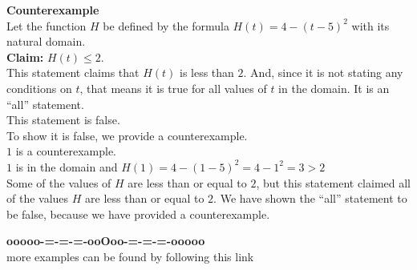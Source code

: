 \documentclass{ximera}
\begin{document}
\begin{example}    \textbf{\textcolor{blue!55!black}{Counterexample}} \\



Let the function $H$ be defined by the formula $H(t) = 4 - (t-5)^2$ with its natural domain. \\

\textbf{\textcolor{blue!55!black}{Claim:}} $H(t) \leq 2$.  \\



This statement claims that $H(t)$ is less than $2$.  And, since it is not stating any conditions on $t$, that means it is true for all values of $t$ in the domain.  It is an ``all'' statement. \\

This statement is false. \\

To show it is false, we provide a counterexample. \\ 


$1$ is a counterexample. \\


$1$ is in the domain and  $H(1) = 4 - (1-5)^2 = 4 - 1^2 = 3 > 2$ \\



Some of the values of $H$ are less than or equal to $2$, but this statement claimed all of the values $H$ are less than or equal to $2$.  We have shown the ``all'' statement to be false, because we have provided a counterexample.



\end{example}










\begin{center}
\textbf{\textcolor{green!50!black}{ooooo-=-=-=-ooOoo-=-=-=-ooooo}} \\

more examples can be found by following this link\\ 

\end{center}
\end{document}
